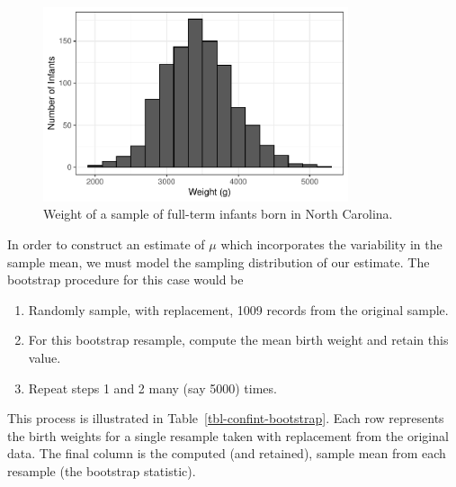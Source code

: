 \documentclass[
  letterpaper,
  DIV=11,
  numbers=noendperiod]{scrreprt}
\providecommand{\tightlist}{%
  \setlength{\itemsep}{0pt}\setlength{\parskip}{0pt}}\usepackage{longtable,booktabs,array}
\theoremstyle{definition}
\theoremstyle{definition}
\theoremstyle{plain}
\theoremstyle{remark}
\begin{document}
\begin{figure}

{\centering \includegraphics[width=0.8\textwidth,height=\textheight]{./images/fig-confint-histogram-1.pdf}

}

\caption{\label{fig-confint-histogram}Weight of a sample of full-term
infants born in North Carolina.}

\end{figure}

In order to construct an estimate of \(\mu\) which incorporates the
variability in the sample mean, we must model the sampling distribution
of our estimate. The bootstrap procedure for this case would be

\begin{enumerate}
\def\labelenumi{\arabic{enumi}.}
\tightlist
\item
  Randomly sample, with replacement, 1009 records from the original
  sample.
\item
  For this bootstrap resample, compute the mean birth weight and retain
  this value.
\item
  Repeat steps 1 and 2 many (say 5000) times.
\end{enumerate}

This process is illustrated in Table~\ref{tbl-confint-bootstrap}. Each
row represents the birth weights for a single resample taken with
replacement from the original data. The final column is the computed
(and retained), sample mean from each resample (the bootstrap
statistic).
\end{document}

